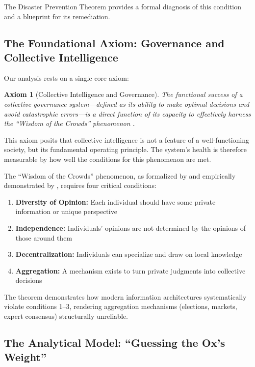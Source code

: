 \documentclass[11pt,a4paper]{article}
\newtheorem{axiom}{Axiom}[section]
\begin{document}
\begin{small}
The Disaster Prevention Theorem provides a formal diagnosis of this condition and a blueprint for its remediation.

\subsection{The Foundational Axiom: Governance and Collective Intelligence}

Our analysis rests on a single core axiom:

\begin{axiom}[Collective Intelligence and Governance]
The functional success of a collective governance system---defined as its ability to make optimal decisions and avoid catastrophic errors---is a direct function of its capacity to effectively harness the ``Wisdom of the Crowds'' phenomenon \citep{Surowiecki2004}.
\end{axiom}

This axiom posits that collective intelligence is not a feature of a well-functioning society, but its fundamental operating principle. The system's health is therefore measurable by how well the conditions for this phenomenon are met.

The ``Wisdom of the Crowds'' phenomenon, as formalized by \citet{Surowiecki2004} and empirically demonstrated by \citet{Galton1907}, requires four critical conditions:

\begin{enumerate}
    \item \textbf{Diversity of Opinion:} Each individual should have some private information or unique perspective
    \item \textbf{Independence:} Individuals' opinions are not determined by the opinions of those around them
    \item \textbf{Decentralization:} Individuals can specialize and draw on local knowledge
    \item \textbf{Aggregation:} A mechanism exists to turn private judgments into collective decisions
\end{enumerate}

The theorem demonstrates how modern information architectures systematically violate conditions 1--3, rendering aggregation mechanisms (elections, markets, expert consensus) structurally unreliable.

\subsection{The Analytical Model: ``Guessing the Ox's Weight''}


\end{small}
\end{document}

